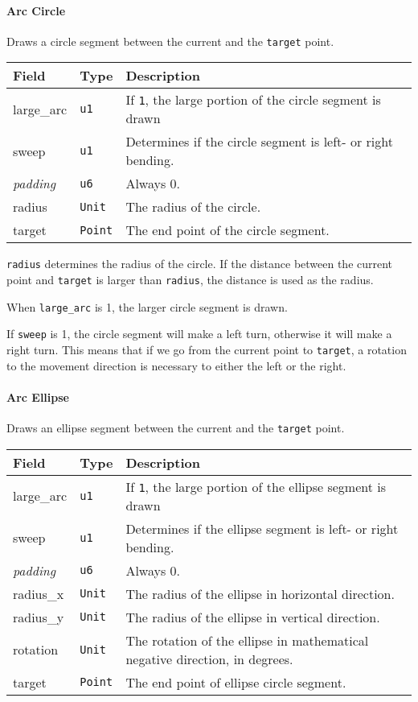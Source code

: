 \documentclass[]{article}
\begin{document}
\hypertarget{arc-circle}{%
\paragraph{Arc Circle}\label{arc-circle}}

Draws a circle segment between the current and the \texttt{target}
point.

\begin{longtable}[]{@{}p{1in}p{2in}p{3in}@{}}
\toprule
Field & Type & Description \\
\midrule
\endhead
large\_arc & \texttt{u1} & If \texttt{1}, the large portion of the
circle segment is drawn \\
sweep & \texttt{u1} & Determines if the circle segment is left- or right
bending. \\
\emph{padding} & \texttt{u6} & Always 0. \\
radius & \texttt{Unit} & The radius of the circle. \\
target & \texttt{Point} & The end point of the circle segment. \\
\bottomrule
\end{longtable}

\texttt{radius} determines the radius of the circle. If the distance
between the current point and \texttt{target} is larger than
\texttt{radius}, the distance is used as the radius.

When \texttt{large\_arc} is 1, the larger circle segment is drawn.

If \texttt{sweep} is 1, the circle segment will make a left turn,
otherwise it will make a right turn. This means that if we go from the
current point to \texttt{target}, a rotation to the movement direction
is necessary to either the left or the right.

\hypertarget{arc-ellipse}{%
\paragraph{Arc Ellipse}\label{arc-ellipse}}

Draws an ellipse segment between the current and the \texttt{target}
point.

\begin{longtable}[]{@{}p{1in}p{2in}p{3in}@{}}
\toprule
Field & Type & Description \\
\midrule
\endhead
large\_arc & \texttt{u1} & If \texttt{1}, the large portion of the
ellipse segment is drawn \\
sweep & \texttt{u1} & Determines if the ellipse segment is left- or
right bending. \\
\emph{padding} & \texttt{u6} & Always 0. \\
radius\_x & \texttt{Unit} & The radius of the ellipse in horizontal
direction. \\
radius\_y & \texttt{Unit} & The radius of the ellipse in vertical
direction. \\
rotation & \texttt{Unit} & The rotation of the ellipse in mathematical
negative direction, in degrees. \\
target & \texttt{Point} & The end point of ellipse circle segment. \\
\bottomrule
\end{longtable}
\end{document}
